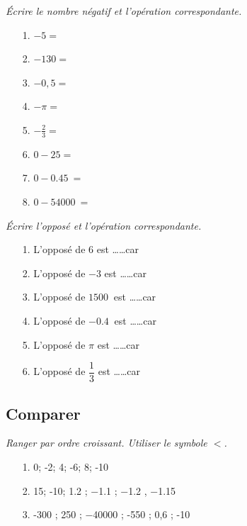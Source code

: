 \begin{multicols}{2}

  \textit{Écrire le nombre négatif et l'opération correspondante.}

  \begin{enumerate}
    \item[1.] $  -5 = $ \dotfill
    \item[2.] $-130 = $ \dotfill
    \item[3.] $-0,5 = $ \dotfill
    \item[4.] $-\pi = $ \dotfill
    \item[5.] $ -\frac{2}{3} = $ \dotfill
    \item[6.] $0 - 25 = $  \dotfill
    \item[7.] $0 - \SI{0,45}{} = $  \dotfill
    \item[8.] $0 - \SI{54000}{} = $  \dotfill   
  \end{enumerate}
  \columnbreak

  \textit{Écrire l'opposé et l'opération correspondante.}

  \begin{enumerate}
    \item[1.] L'opposé de $6$ est \dots \dots car \dotfill
    \item[2.] L'opposé de $-3$ est \dots \dots car \dotfill
    \item[3.] L'opposé de $\SI{1500}{}$ est \dots \dots car \dotfill
    \item[4.] L'opposé de $\SI{-0,4}{}$ est \dots \dots car \dotfill
    \item[5.] L'opposé de $\pi$ est \dots \dots car \dotfill
    \item[6.] L'opposé de $\dfrac{1}{3}$ est \dots \dots car \dotfill
  \end{enumerate}

\end{multicols}

\subsection*{Comparer}

\textit{Ranger par ordre croissant. Utiliser le symbole $<$.}

\begin{enumerate}
  \item[1.] 0; -2; 4; -6; 8; -10
  \Pointilles[1]   
  \item[2.] 15; -10; \SI{1,2}{} ; \SI{-1,1}{} ; \SI{-1,2}{} , \SI{-1,15}{} 
  \Pointilles[1]   
  \item[3.] -300 ; 250 ; \SI{-40000}{} ; -550 ; 0,6 ; -10
  \Pointilles[1]   
\end{enumerate}

